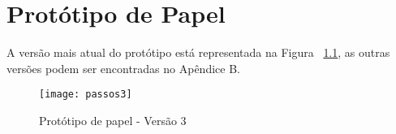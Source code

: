 \chapter{Protótipo de Papel}

	A versão mais atual do protótipo está representada na Figura ~\ref{fig:passos2}, as outras versões podem ser encontradas no Apêndice B.

\begin{figure}[!htb]
 \centering
 \texttt{[image: passos3]}
 \caption{Protótipo de papel - Versão 3}
 \label{fig:passos2}

\end{figure}
